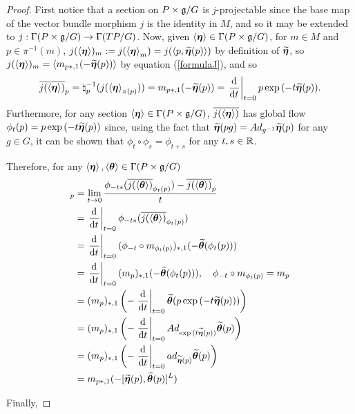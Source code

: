 \begin{proof}
First notice that a section on $P \times \mathfrak{g}/G$ is $j$-projectable since the base map of the vector bundle morphism $j$ is the identity in $M$, and so it may be extended to $j:\Gamma(P \times \mathfrak{g}/G) \to \Gamma(TP/G)$. Now, given $\left\langle \bm{\eta} \right\rangle \in \Gamma(P \times \mathfrak{g}/G)$, for $m \in M$ and $p \in \pi^{-1}(m)$, $j(\left\langle \bm{\eta} \right\rangle)_m := j(\left\langle \bm{\eta} \right\rangle_m) = j(\left\langle p, \widetilde{\bm{\eta}}(p) \right\rangle)$ by definition of $\widetilde{\bm{\eta}}$, so $j(\left\langle \bm{\eta} \right\rangle)_m = \left\langle m_{p*, 1}(-\widetilde{\bm{\eta}}(p)) \right\rangle$ by equation (\ref{formulaJ}), and so
\begin{align}
    \up{j(\downsect{\eta})}_p = \natural_p^{-1}(j(\downsect{\eta}_{\pi(p)})) = m_{p*,1}(-\stilde{\eta}(p)) = \der{t}[t = 0] p \exp{(-t \stilde{\eta}(p))}.
\end{align}
Furthermore, for any section $\left\langle \bm{\eta} \right\rangle \in \Gamma(P \times \mathfrak{g}/G)$, $\overline{j(\left\langle \bm{\eta} \right\rangle)}$ has global flow $\phi_t(p) = p \exp{(-t \stilde{\eta}(p))}$ since, using the fact that $\widetilde{\bm{\eta}}(pg) = Ad_{g^{-1}} \widetilde{\bm{\eta}}(p)$ for any $g \in G$, it can be shown that $\phi_t \circ \phi_s = \phi_{t + s}$ for any $t, s \in \mathbb{R}$.

Therefore, for any $\left\langle \bm{\eta} \right\rangle, \left\langle \bm{\theta} \right\rangle \in \Gamma(P \times \mathfrak{g}/ G)$
\begin{align*}
    [\up{j(\downsect{\eta})}, \up{j(\downsect{\theta})}]_p 
    &= \lim_{t \to 0} \frac{\phi_{-t*}(\up{j(\downsect{\theta})}_{\phi_t(p)})  - \up{j(\downsect{\theta})}_{p} }{t}\\
    &= \der{t}[t = 0] \phi_{-t*} (\up{j(\downsect{\theta})}_{\phi_{t}(p)}) \\
    &= \der{t}[t = 0] (\phi_{-t} \circ m_{\phi_{t}(p)})_{*, 1} (-\stilde{\theta}(\phi_{t}(p)))\\
    &= \der{t}[t = 0] (m_{p})_{*, 1} (-\stilde{\theta}(\phi_{t}(p))), \quad \phi_{-t} \circ m_{\phi_{t}(p)} = m_p \\
    &= (m_{p})_{*, 1} \left(- \der{t}[t = 0] \stilde{\theta}(p \exp{(-t \stilde{\eta}(p))}) \right)\\
    &= (m_{p})_{*, 1} \left(- \der{t}[t = 0] Ad_{\exp{(t \stilde{\eta}(p))}}\stilde{\theta}(p) \right) \\
    &= (m_{p})_{*, 1} \left(- \der{t}[t = 0] ad_{\stilde{\eta}(p)}\stilde{\theta}(p) \right) \\
    &= m_{p*, 1} (-[\stilde{\eta}(p), \stilde{\theta}(p)]^L)
\end{align*}

Finally,


\end{proof}
